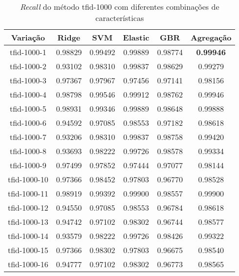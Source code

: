 \begin{table}[H]
\centering
\begin{tabular}{|c| c c  c  c  c| }
\hline
Variação &  Ridge & SVM & Elastic & GBR & Agregação  \\ 
\hline
tfid-1000-1 & 0.98829 & 0.99492 & 0.99889 & 0.98774 & \textbf{0.99946} \\
\hline
tfid-1000-2 & 0.93102 & 0.98310 & 0.99837 & 0.98629 & 0.99279 \\
\hline
tfid-1000-3 & 0.97367 & 0.97967 & 0.97456 & 0.97141 & 0.98156 \\
\hline
tfid-1000-4 & 0.98798 & 0.99546 & 0.99912 & 0.98762 & 0.99946 \\
\hline
tfid-1000-5 & 0.98931 & 0.99346 & 0.99889 & 0.98648 & 0.99888 \\
\hline
tfid-1000-6 & 0.94592 & 0.97085 & 0.98553 & 0.97182 & 0.98618 \\
\hline
tfid-1000-7 & 0.93206 & 0.98310 & 0.99837 & 0.98758 & 0.99420 \\
\hline
tfid-1000-8 & 0.93693 & 0.98222 & 0.99726 & 0.98578 & 0.99334 \\
\hline
tfid-1000-9 & 0.97499 & 0.97852 & 0.97444 & 0.97077 & 0.98144 \\
\hline
tfid-1000-10 & 0.97366 & 0.98452 & 0.97803 & 0.96770 & 0.98528 \\
\hline
tfid-1000-11 & 0.98919 & 0.99392 & 0.99900 & 0.98557 & 0.99900 \\
\hline
tfid-1000-12 & 0.94550 & 0.97085 & 0.98553 & 0.96784 & 0.98618 \\
\hline
tfid-1000-13 & 0.94742 & 0.97102 & 0.98302 & 0.96744 & 0.98577 \\
\hline
tfid-1000-14 & 0.93579 & 0.98222 & 0.99726 & 0.98426 & 0.99322 \\
\hline
tfid-1000-15 & 0.97366 & 0.98302 & 0.97803 & 0.96675 & 0.98540 \\
\hline
tfid-1000-16 & 0.94777 & 0.97102 & 0.98302 & 0.96773 & 0.98565 \\
\hline
\end{tabular}
\caption{\textit{Recall} do método tfid-1000 com diferentes combinações de características}
\label{tab:recalltfid1000}
\end{table}


